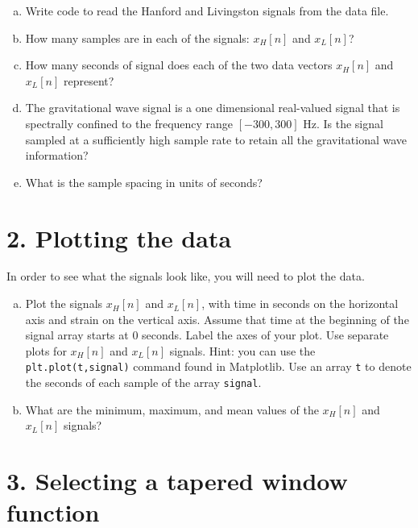 \begin{enumerate}[a)]

  \item Write code to read the Hanford and Livingston signals from the data file.

  \item How many samples are in each of the signals: $x_H[n]$ and $x_L[n]$?

  \item How many seconds of signal does each of the two data vectors $x_H[n]$ and $x_L[n]$ represent?

  \item The gravitational wave signal is a one dimensional real-valued
        signal that is spectrally confined to the frequency range $[-300, 300]$ Hz.
        Is the signal sampled at a sufficiently high sample rate
        to retain all the gravitational wave information?

  \item What is the sample spacing in units of seconds?
\end{enumerate}

\section{2. Plotting the data}

In order to see what the signals look like, you will need to plot the data.
\begin{enumerate}[a)]
  \item Plot the signals $x_H[n]$ and $x_L[n]$, with time in seconds on
        the horizontal axis and strain on the vertical axis. Assume that
        time at the beginning of the signal array starts at $0$ seconds. Label
        the axes of your plot. Use separate plots for $x_H[n]$ and $x_L[n]$
        signals. Hint: you can use the \verb|plt.plot(t,signal)| command found
        in Matplotlib. Use an array \verb|t| to denote the seconds of each sample of the array \verb|signal|.

  \item What are the minimum, maximum, and mean values of the $x_H[n]$ and $x_L[n]$ signals?

\end{enumerate}

\section{3. Selecting a tapered window function}

